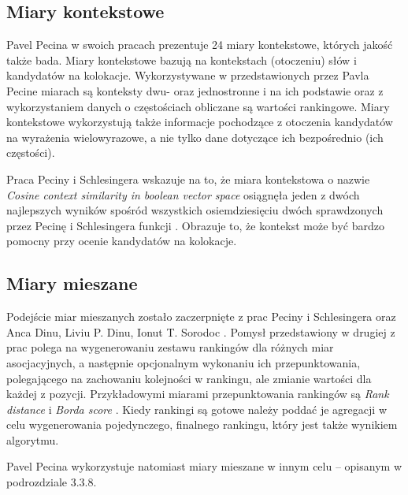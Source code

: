 \subsection{Miary kontekstowe}
Pavel Pecina w swoich pracach \cite[str. 18]{pecina_measures}\cite[str. 3]{coling} prezentuje 24 miary kontekstowe, których jakość także bada.
Miary kontekstowe bazują na kontekstach (otoczeniu) słów i kandydatów na kolokacje.
Wykorzystywane w przedstawionych przez Pavla Pecine miarach są konteksty dwu- oraz jednostronne i na ich podstawie oraz z wykorzystaniem danych o częstościach obliczane są wartości rankingowe.
Miary kontekstowe wykorzystują także informacje pochodzące z otoczenia kandydatów na wyrażenia wielowyrazowe, a nie tylko dane dotyczące ich bezpośrednio (ich częstości).
\par
Praca Peciny i Schlesingera \cite[str. 4]{coling} wskazuje na to, że miara kontekstowa o nazwie \emph{Cosine context similarity in boolean vector space} osiągnęła jeden z dwóch najlepszych wyników spośród wszystkich osiemdziesięciu dwóch sprawdzonych przez Pecinę i Schlesingera funkcji \cite[str. 4]{coling}.
Obrazuje to, że kontekst może być bardzo pomocny przy ocenie kandydatów na kolokacje.


\subsection{Miary mieszane}
Podejście miar mieszanych zostało zaczerpnięte z prac Peciny i Schlesingera \cite{coling} oraz Anca Dinu, Liviu P. Dinu, Ionut T. Sorodoc \cite{aggregation}.
Pomysł przedstawiony w drugiej z prac polega na wygenerowaniu zestawu rankingów dla różnych miar asocjacyjnych, a następnie opcjonalnym wykonaniu ich przepunktowania, polegającego na zachowaniu kolejności w rankingu, ale zmianie wartości dla każdej z pozycji.
Przykładowymi miarami przepunktowania rankingów są \emph{Rank distance} i \emph{Borda score} \cite[str. 2]{aggregation}.
Kiedy rankingi są gotowe należy poddać je agregacji w celu wygenerowania pojedynczego, finalnego rankingu, który jest także wynikiem algorytmu.
\par
Pavel Pecina wykorzystuje natomiast miary mieszane w innym celu -- opisanym w podrozdziale 3.3.8.


